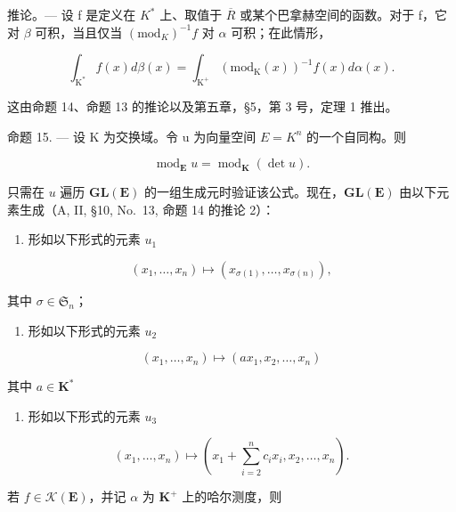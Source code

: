 推论。--- 设 f 是定义在 \(K^{*}\) 上、取值于 \(\overline{R}\) 或某个巴拿赫空间的函数。对于 f，它对 \(\beta\) 可积，当且仅当 \((\mathrm{mod}_K)^{-1}f\) 对 \(\alpha\) 可积；在此情形，

\[
\int_ {\mathrm{K} ^ {*}} f (x) d \beta (x) = \int_ {\mathrm{K} ^ {+}} \left(\mathrm{mod} _ {\mathrm{K}} (x)\right) ^ {- 1} f (x) d \alpha (x).
\]

这由命题 14、命题 13 的推论以及第五章，§5，第 3 号，定理 1 推出。

命题 15. --- 设 K 为交换域。令 u 为向量空间 \(E = K^{n}\) 的一个自同构。则

\[
\operatorname{mod} _ {\mathbf {E}} u = \operatorname{mod} _ {\mathbf {K}} (\det u).
\]

只需在 \(u\) 遍历 \(\mathbf{GL}(\mathbf{E})\) 的一组生成元时验证该公式。现在，\(\mathbf{GL}(\mathbf{E})\) 由以下元素生成（A, II, §10, No.~13, 命题 14 的推论 2）：

\begin{enumerate}
\def\labelenumi{(\alph{enumi})}
\tightlist
\item
  形如以下形式的元素 \(u_{1}\)
\end{enumerate}

\[
\left(x _ {1}, \dots , x _ {n}\right) \mapsto \left(x _ {\sigma (1)}, \dots , x _ {\sigma (n)}\right),
\]

其中 \(\sigma \in \mathfrak{S}_n\)；

\begin{enumerate}
\def\labelenumi{(\alph{enumi})}
\setcounter{enumi}{1}
\tightlist
\item
  形如以下形式的元素 \(u_{2}\)
\end{enumerate}

\[
\left(x _ {1}, \dots , x _ {n}\right) \mapsto \left(a x _ {1}, x _ {2}, \dots , x _ {n}\right)
\]

其中 \(a\in \mathbf{K}^*\)

\begin{enumerate}
\def\labelenumi{(\alph{enumi})}
\setcounter{enumi}{2}
\tightlist
\item
  形如以下形式的元素 \(u_{3}\)
\end{enumerate}

\[
\left(x _ {1}, \dots , x _ {n}\right) \mapsto \left(x _ {1} + \sum_ {i = 2} ^ {n} c _ {i} x _ {i}, x _ {2}, \dots , x _ {n}\right).
\]

若 \(f \in \mathcal{K}(\mathbf{E})\)，并记 \(\alpha\) 为 \(\mathbf{K}^+\) 上的哈尔测度，则

